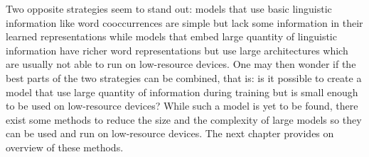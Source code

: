   Two opposite strategies seem to stand out: models that use basic linguistic
  information like word cooccurrences are simple but lack some information in
  their learned representations while models that embed large quantity of
  linguistic information have richer word representations but use large
  architectures which are usually not able to run on low-resource devices. One
  may then wonder if the best parts of the two strategies can be combined, that
  is: is it possible to create a model that use large quantity of information
  during training but is small enough to be used on low-resource devices? While
  such a model is yet to be found, there exist some methods to reduce the size
  and the complexity of large models so they can be used and run on low-resource
  devices. The next chapter provides on overview of these methods.
